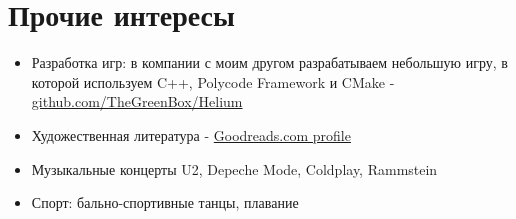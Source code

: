 \documentclass[a4paper, 11pt]{article}
\begin{document}
\section{Прочие интересы}
\begin{itemize}
    \item   Разработка игр: в компании с моим другом разрабатываем
            небольшую игру, в которой используем C++, Polycode Framework и CMake -
            \href{https://github.com/thegreenbox/helium}{github.com/TheGreenBox/Helium}
    \item   Художественная литература -
            \href{https://www.goodreads.com/user/show/29629010-sergey-nikitin}{Goodreads.com profile}
    \item   Музыкальные концерты U2, Depeche Mode, Coldplay, Rammstein
    \item   Спорт: бально-спортивные танцы, плавание
\end{itemize}
\end{document}
